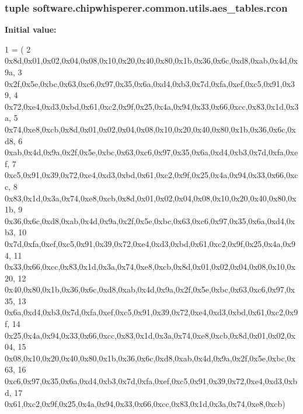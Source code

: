 \subsubsection[{rcon}]{\setlength{\rightskip}{0pt plus 5cm}tuple software.\+chipwhisperer.\+common.\+utils.\+aes\+\_\+tables.\+rcon}\label{namespacesoftware_1_1chipwhisperer_1_1common_1_1utils_1_1aes__tables_ae93089d334185cfea043114defec83dd}
{\bfseries Initial value\+:}
\begin{DoxyCode}
1 = (
2 0x8d,0x01,0x02,0x04,0x08,0x10,0x20,0x40,0x80,0x1b,0x36,0x6c,0xd8,0xab,0x4d,0x9a,
3 0x2f,0x5e,0xbc,0x63,0xc6,0x97,0x35,0x6a,0xd4,0xb3,0x7d,0xfa,0xef,0xc5,0x91,0x39,
4 0x72,0xe4,0xd3,0xbd,0x61,0xc2,0x9f,0x25,0x4a,0x94,0x33,0x66,0xcc,0x83,0x1d,0x3a,
5 0x74,0xe8,0xcb,0x8d,0x01,0x02,0x04,0x08,0x10,0x20,0x40,0x80,0x1b,0x36,0x6c,0xd8,
6 0xab,0x4d,0x9a,0x2f,0x5e,0xbc,0x63,0xc6,0x97,0x35,0x6a,0xd4,0xb3,0x7d,0xfa,0xef,
7 0xc5,0x91,0x39,0x72,0xe4,0xd3,0xbd,0x61,0xc2,0x9f,0x25,0x4a,0x94,0x33,0x66,0xcc,
8 0x83,0x1d,0x3a,0x74,0xe8,0xcb,0x8d,0x01,0x02,0x04,0x08,0x10,0x20,0x40,0x80,0x1b,
9 0x36,0x6c,0xd8,0xab,0x4d,0x9a,0x2f,0x5e,0xbc,0x63,0xc6,0x97,0x35,0x6a,0xd4,0xb3,
10 0x7d,0xfa,0xef,0xc5,0x91,0x39,0x72,0xe4,0xd3,0xbd,0x61,0xc2,0x9f,0x25,0x4a,0x94,
11 0x33,0x66,0xcc,0x83,0x1d,0x3a,0x74,0xe8,0xcb,0x8d,0x01,0x02,0x04,0x08,0x10,0x20,
12 0x40,0x80,0x1b,0x36,0x6c,0xd8,0xab,0x4d,0x9a,0x2f,0x5e,0xbc,0x63,0xc6,0x97,0x35,
13 0x6a,0xd4,0xb3,0x7d,0xfa,0xef,0xc5,0x91,0x39,0x72,0xe4,0xd3,0xbd,0x61,0xc2,0x9f,
14 0x25,0x4a,0x94,0x33,0x66,0xcc,0x83,0x1d,0x3a,0x74,0xe8,0xcb,0x8d,0x01,0x02,0x04,
15 0x08,0x10,0x20,0x40,0x80,0x1b,0x36,0x6c,0xd8,0xab,0x4d,0x9a,0x2f,0x5e,0xbc,0x63,
16 0xc6,0x97,0x35,0x6a,0xd4,0xb3,0x7d,0xfa,0xef,0xc5,0x91,0x39,0x72,0xe4,0xd3,0xbd,
17 0x61,0xc2,0x9f,0x25,0x4a,0x94,0x33,0x66,0xcc,0x83,0x1d,0x3a,0x74,0xe8,0xcb)
\end{DoxyCode}
\hypertarget{namespacesoftware_1_1chipwhisperer_1_1common_1_1utils_1_1aes__tables_ab29ec75e9f1c27e4d0e14aa03b1558ba}{}
